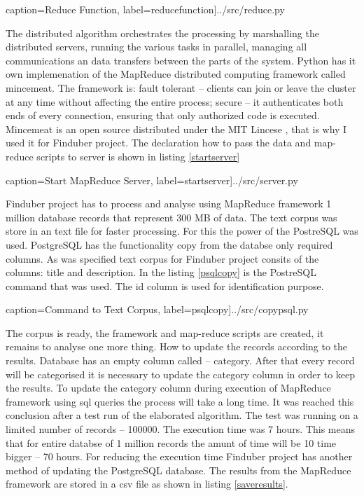  caption={Reduce Function}, label=reducefunction]{../src/reduce.py}

The distributed algorithm orchestrates the processing by marshalling the distributed servers, running the various tasks in parallel, managing all communications an data transfers between the parts of the system. Python has it own implemenation of the MapReduce distributed computing framework called mincemeat. The framework is: fault tolerant -- clients can join or leave the cluster at any time without affecting the entire process; secure -- it authenticates both ends of every connection, ensuring that only authorized code is executed. Mincemeat is an open source distributed under the MIT Lincese , that is why I used it for Finduber project. The declaration how to pass the data and map-reduce scripts to server is shown in listing \ref{startserver}

 caption={Start MapReduce Server}, label=startserver]{../src/server.py}

Finduber project has to process and analyse using MapReduce framework 1 million database records that represent 300 MB of data. The text corpus was store in an text file for faster processing. For this the power of the PostreSQL was used. PostgreSQL has the functionality copy from the databse only required columns. As was specified text corpus for Finduber project consits of the columns: title and description. In the listing \ref{psqlcopy} is the PostreSQL command that was used. The id column is used for identification purpose.

 caption={Command to Text Corpus}, label=psqlcopy]{../src/copypsql.py}

The corpus is ready, the framework and map-reduce scripts are created, it remains to analyse one more thing. How to update the records according to the results. Database has an empty column called -- category. After that every record will be categorised it is necessary to update the category column in order to keep the results. To update the category column during execution of MapReduce framework using sql queries the process will take a long time. It was reached this conclusion after a test run of the elaborated algorithm. The test was running on a limited number of records -- 100000. The execution time was 7 hours. This means that for entire databse of 1 million records the amunt of time will be 10 time bigger -- 70 hours. For reducing the execution time Finduber project has another method of updating the PostgreSQL database. The results from the MapReduce framework are stored in a csv file as shown in listing \ref{saveresults}.

